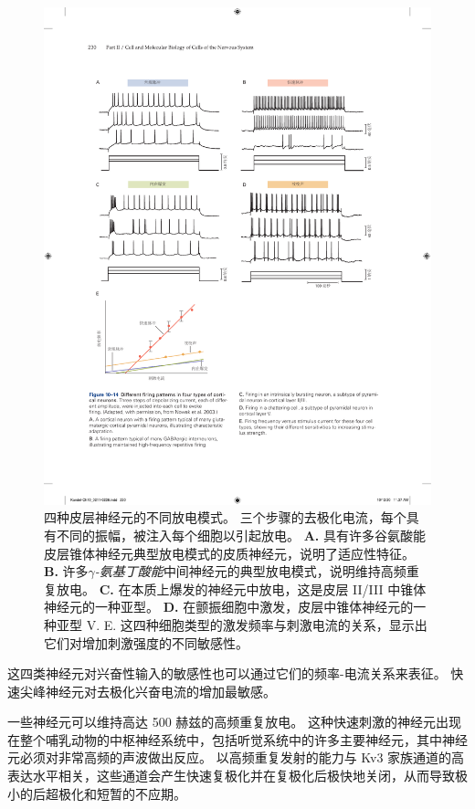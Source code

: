 \begin{figure}[htbp]
	\centering
	\includegraphics[width=1.0\linewidth]{chap10/fig_10_14}
	\caption{四种皮层神经元的不同放电模式。
		三个步骤的去极化电流，每个具有不同的振幅，被注入每个细胞以引起放电\cite{nowak2003electrophysiological}。
		\textbf{A.} 具有许多谷氨酸能皮层锥体神经元典型放电模式的皮质神经元，说明了适应性特征。
		\textbf{B.} 许多\textit{$\gamma$-氨基丁酸能}中间神经元的典型放电模式，说明维持高频重复放电。
		\textbf{C.} 在本质上爆发的神经元中放电，这是皮层 II/III 中锥体神经元的一种亚型。
		\textbf{D.} 在颤振细胞中激发，皮层中锥体神经元的一种亚型 V. E. 这四种细胞类型的激发频率与刺激电流的关系，显示出它们对增加刺激强度的不同敏感性。}
	\label{fig:10_14}
\end{figure}


这四类神经元对兴奋性输入的敏感性也可以通过它们的频率-电流关系来表征。
快速尖峰神经元对去极化兴奋电流的增加最敏感。


一些神经元可以维持高达 500 赫兹的高频重复放电。
这种快速刺激的神经元出现在整个哺乳动物的中枢神经系统中，包括听觉系统中的许多主要神经元，其中神经元必须对非常高频的声波做出反应。
以高频重复发射的能力与 Kv3 家族通道的高表达水平相关，这些通道会产生快速复极化并在复极化后极快地关闭，从而导致极小的后超极化和短暂的不应期。


